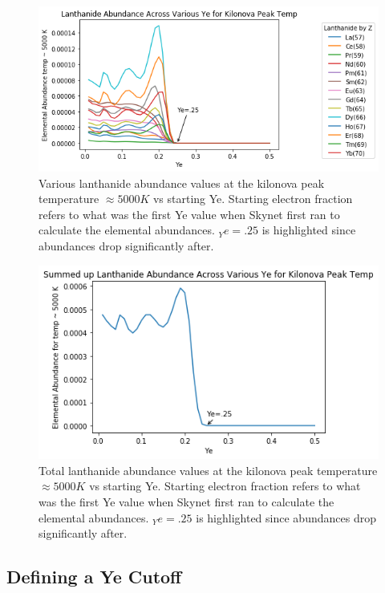\documentclass[11pt,a4paper]{article}
\begin{document}
\begin{figure}[h!]
  \includegraphics[scale = .6]{abun_vs_ye_temp.png}
  \centering
  \caption{Various lanthanide abundance values at the kilonova peak temperature $\approx 5000K$ vs starting Ye. Starting electron fraction refers to what was the first Ye value when Skynet first ran to calculate the elemental abundances. $_Ye = .25$ is highlighted since abundances drop significantly after.}
\end{figure} 


\begin{figure}[h!]
  \includegraphics[scale = .6]{summed.png}
  \centering
  \caption{Total lanthanide abundance values at the kilonova peak temperature $\approx 5000K$ vs starting Ye. Starting electron fraction refers to what was the first Ye value when Skynet first ran to calculate the elemental abundances. $_Ye = .25$ is highlighted since abundances drop significantly after.}
\end{figure} 


\subsection{Defining a Ye Cutoff}
\end{document}

